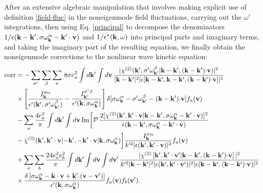 \documentclass[12pt,a4paper,ruledheader]{report}
\begin{document}
After an extensive algebraic manipulation that involves making explicit
use of definition \eqref{field-fluc} in the noneigenmode field fluctuations,
carrying out the $\omega '$ integrations, then using Eq. \eqref{principal}
to decompose the denominators
$1/\epsilon({\bf k-k'},\sigma \omega_{\bf k}^\alpha-{\bf k'\cdot v})$
and $1/\epsilon^*({\bf k},\omega)$ into principal parts and imaginary terms,
and taking the imaginary part of the resulting equation, we finally obtain
the noneigenmode corrections to the nonlinear wave kinetic equation:
\begin{equation}
  \label{corr}
  \begin{split}
    \mbox{corr}&=-\sum_{\sigma '}\sum_\beta\sum_a \,8\pi e_a^2
    \int d{\bf k'}\int d{\bf v}\,
    \frac{|\chi^{(2)}({\bf k'},\sigma '\omega_{\bf k'}^\beta|{\bf k-k'},
      ({\bf k-k'}){\bf \cdot v})|^2}
    {|{\bf k-k'}|^2|\epsilon[{\bf k-k'},{\bf k-k'},({\bf k-k'}){\bf \cdot v}]|^2}\\
    &\times \left[ \frac{I_{\bf k}^{\sigma \alpha}}
      {\epsilon '({\bf k'},\sigma '\omega_{\bf k'}^\beta)}
      -\frac{I_{\bf k'}^{\sigma '\beta}}
	{\epsilon '({\bf k},\sigma \omega_{\bf k}^\alpha)}\right] 
    \delta[\sigma\omega_{\bf k}^\alpha-\sigma '\omega_{\bf k'}^\beta
    -({\bf k-k'}){\bf \cdot v}]f_a({\bf v})\\
    &-\sum_a \frac{4 e_a^2}{\pi}
    \int d{\bf k '}\int d{\bf v}\,\mbox{Im}\biggl[ \mathcal{P}\,
    \frac{2[\chi^{(2)}({\bf k'},{\bf k' \cdot v}|{\bf k-k'},
      \sigma\omega_{\bf k}^\alpha-{\bf k'\cdot v})]^2}
    {\epsilon({\bf k-k'},\sigma \omega_{\bf k}^\alpha-{\bf k'\cdot v})}\\
    &-\bar \chi^{(3)}({\bf k'},{\bf k' \cdot v}|{\bf -k'},{\bf -k'\cdot v}
    |{\bf k},\sigma\omega_{\bf k}^\alpha)\biggr]
    \frac{I_{\bf k}^{\sigma \alpha}}{k'^2|\epsilon({\bf k'},{\bf k'\cdot v})|^2}
    f_a({\bf v})\\
    &+\sum_a\sum_b \frac{24 e_a^2 e_b^2}{\pi}\int d{\bf k '}
    \int d{\bf v} \int d{\bf v'}\,
    \frac{|\chi^{(2)} \left[ {\bf k'},{\bf k' \cdot v'}|
     {\bf k-k'},({\bf k-k'}){\bf \cdot v} \right]|^2}{k'^2|{\bf k-k'}|^2
   |\epsilon({\bf k'},{\bf k'\cdot v'})|^2
 |\epsilon({\bf k-k'},({\bf k-k'}){\bf \cdot v})|^2}\\
    &\times \frac{\delta \left[ \sigma\omega_{\bf k}^\alpha-{\bf k \cdot v}
	+{\bf k' \cdot}({\bf v-v'})\right]}
    {\epsilon '({\bf k},\sigma\omega_{\bf k}^\alpha)}f_a({\bf v}) f_b({\bf v'}).
  \end{split}
\end{equation}
\end{document}

